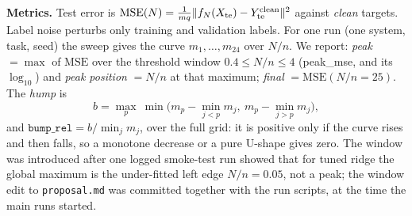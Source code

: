 \textbf{Metrics.} Test error is $\mathrm{MSE}(N)=\frac1{m q}\|f_N(X_{\rm te})-Y^{\rm clean}_{\rm te}\|^2$ against \emph{clean} targets. Label noise perturbs only training and validation labels. For one run (one system, task, seed) the sweep gives the curve $m_1,\dots,m_{24}$ over $N/n$. We report: \emph{peak} $=\max$ of $\mathrm{MSE}$ over the threshold window $0.4\le N/n\le4$ (peak\_mse, and its $\log_{10}$) and \emph{peak position} $=N/n$ at that maximum; \emph{final} $=\mathrm{MSE}(N/n{=}25)$. The \emph{hump} is
\begin{equation}
b=\max_{p}\ \min\Big(m_p-\min_{j<p}m_j,\ m_p-\min_{j>p}m_j\Big),
\end{equation}
and $\texttt{bump\_rel}=b/\min_j m_j$, over the full grid: it is positive only if the curve rises and then falls, so a monotone decrease or a pure U-shape gives zero. The window was introduced after one logged smoke-test run showed that for tuned ridge the global maximum is the under-fitted left edge $N/n=0.05$, not a peak; the window edit to \texttt{proposal.md} was committed together with the run scripts, at the time the main runs started.
